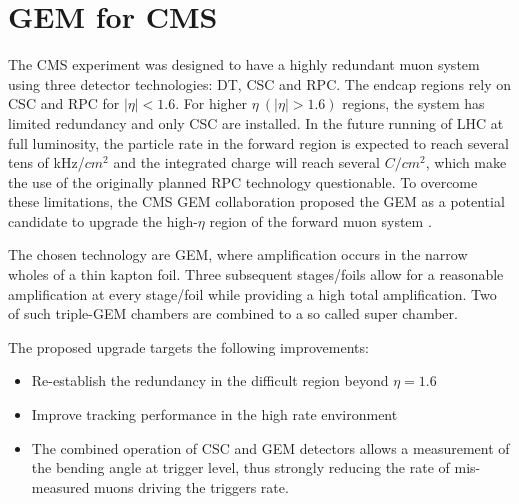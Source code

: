 
\section{GEM for CMS}
The CMS experiment was designed to have a highly redundant muon system using three detector technologies: DT, CSC and RPC. The endcap regions rely on CSC and RPC for $|\eta|<1.6$. For higher $\eta~ (|\eta|>1.6)$ regions, the system has limited redundancy and only CSC are installed. In the future running of LHC at full luminosity, the particle rate in the forward region is expected to reach several tens of kHz/$cm^2$ and the integrated charge will reach several $C/cm^2$, which make the use of the originally planned RPC technology questionable. To overcome these limitations, the CMS GEM collaboration proposed the GEM as a potential candidate to upgrade the high-$\eta$ region of the forward muon system \cite{Colaleo:2021453}. 

The chosen technology are GEM, where amplification occurs in the narrow wholes of a thin kapton foil. Three subsequent stages/foils allow for a reasonable amplification at every stage/foil while providing a high total amplification. Two of such triple-GEM chambers are combined to a so called super chamber.

The proposed upgrade targets the following improvements:
	\begin{itemize}
		\item Re-establish the redundancy in the difficult region beyond $\eta = 1.6 $
		\item Improve tracking performance in the high rate environment
		\item The combined operation of CSC and GEM detectors allows a measurement of the bending angle at trigger level, thus strongly reducing the rate of mis-measured muons driving the triggers rate.
	\end{itemize}

